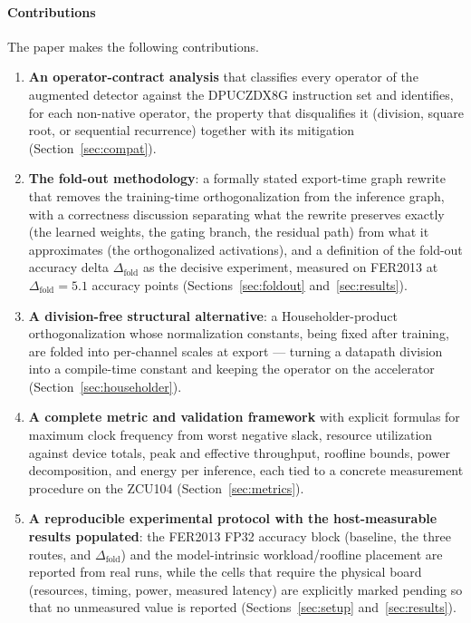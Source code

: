 \documentclass[onecolumn,journal]{IEEEtran}
\begin{document}
\paragraph*{Contributions} The paper makes the following contributions.
\begin{enumerate}
\item \textbf{An operator-contract analysis} that classifies every operator of the
augmented detector against the DPUCZDX8G instruction set and identifies, for each
non-native operator, the property that disqualifies it (division, square root, or
sequential recurrence) together with its mitigation (Section~\ref{sec:compat}).
\item \textbf{The fold-out methodology}: a formally stated export-time graph rewrite
that removes the training-time orthogonalization from the inference graph, with a
correctness discussion separating what the rewrite preserves exactly (the learned
weights, the gating branch, the residual path) from what it approximates (the
orthogonalized activations), and a definition of the fold-out accuracy delta
$\Delta_{\mathrm{fold}}$ as the decisive experiment, measured on FER2013 at
$\Delta_{\mathrm{fold}}=5.1$ accuracy points (Sections~\ref{sec:foldout}
and~\ref{sec:results}).
\item \textbf{A division-free structural alternative}: a Householder-product
orthogonalization whose normalization constants, being fixed after training, are folded
into per-channel scales at export --- turning a datapath division into a compile-time
constant and keeping the operator on the accelerator (Section~\ref{sec:householder}).
\item \textbf{A complete metric and validation framework} with explicit formulas for
maximum clock frequency from worst negative slack, resource utilization against device
totals, peak and effective throughput, roofline bounds, power decomposition, and energy
per inference, each tied to a concrete measurement procedure on the ZCU104
(Section~\ref{sec:metrics}).
\item \textbf{A reproducible experimental protocol with the host-measurable results
populated}: the FER2013 FP32 accuracy block (baseline, the three routes, and
$\Delta_{\mathrm{fold}}$) and the model-intrinsic workload/roofline placement are
reported from real runs, while the cells that require the physical board (resources,
timing, power, measured latency) are explicitly marked pending so that no unmeasured
value is reported (Sections~\ref{sec:setup} and~\ref{sec:results}).
\end{enumerate}
\end{document}
